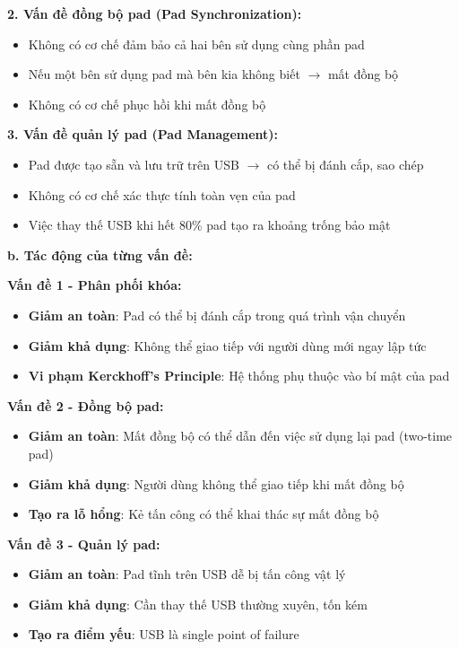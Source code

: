 \textbf{2. Vấn đề đồng bộ pad (Pad Synchronization):}
\begin{itemize}
    \item Không có cơ chế đảm bảo cả hai bên sử dụng cùng phần pad
    \item Nếu một bên sử dụng pad mà bên kia không biết $\rightarrow$ mất đồng bộ
    \item Không có cơ chế phục hồi khi mất đồng bộ
\end{itemize}

\textbf{3. Vấn đề quản lý pad (Pad Management):}
\begin{itemize}
    \item Pad được tạo sẵn và lưu trữ trên USB $\rightarrow$ có thể bị đánh cắp, sao chép
    \item Không có cơ chế xác thực tính toàn vẹn của pad
    \item Việc thay thế USB khi hết 80\% pad tạo ra khoảng trống bảo mật
\end{itemize}

\textbf{b. Tác động của từng vấn đề:}

\textbf{Vấn đề 1 - Phân phối khóa:}
\begin{itemize}
    \item \textbf{Giảm an toàn}: Pad có thể bị đánh cắp trong quá trình vận chuyển
    \item \textbf{Giảm khả dụng}: Không thể giao tiếp với người dùng mới ngay lập tức
    \item \textbf{Vi phạm Kerckhoff's Principle}: Hệ thống phụ thuộc vào bí mật của pad
\end{itemize}

\textbf{Vấn đề 2 - Đồng bộ pad:}
\begin{itemize}
    \item \textbf{Giảm an toàn}: Mất đồng bộ có thể dẫn đến việc sử dụng lại pad (two-time pad)
    \item \textbf{Giảm khả dụng}: Người dùng không thể giao tiếp khi mất đồng bộ
    \item \textbf{Tạo ra lỗ hổng}: Kẻ tấn công có thể khai thác sự mất đồng bộ
\end{itemize}

\textbf{Vấn đề 3 - Quản lý pad:}
\begin{itemize}
    \item \textbf{Giảm an toàn}: Pad tĩnh trên USB dễ bị tấn công vật lý
    \item \textbf{Giảm khả dụng}: Cần thay thế USB thường xuyên, tốn kém
    \item \textbf{Tạo ra điểm yếu}: USB là single point of failure
\end{itemize}

